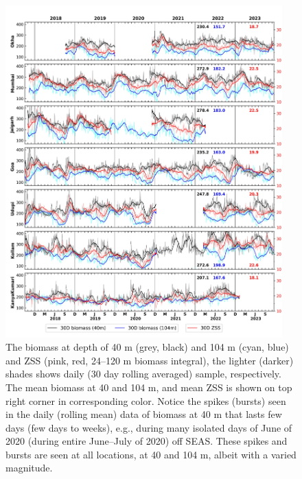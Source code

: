 \documentclass[authoryear,review,12pt]{elsarticle}
\begin{document}
\begin{figure}[htbp]
	\centering
	\includegraphics[width=0.95\textwidth]{./figures/biomass_40m_104m.jpeg} 
	\captionsetup{justification=justified,font=footnotesize,skip=0.05\baselineskip,width=\textwidth}
	\caption{The biomass at depth of 40 m (grey, black) and 104 m (cyan, blue) and ZSS (pink, red, 24--120 m biomass integral), the lighter (darker) shades shows daily (30 day rolling averaged) sample, respectively. The mean biomass at 40 and 104 m, and mean ZSS is shown on  top right corner in corresponding color. Notice the spikes (bursts) seen in the daily (rolling mean) data of biomass at 40 m that lasts few days (few days to weeks), e.g., during many isolated days of June of 2020 (during entire June--July of 2020) off SEAS. These spikes and bursts are seen at all locations, at 40 and 104 m, albeit with a varied magnitude.}
	\label{fig:compfourty}
\end{figure}
\end{document}
